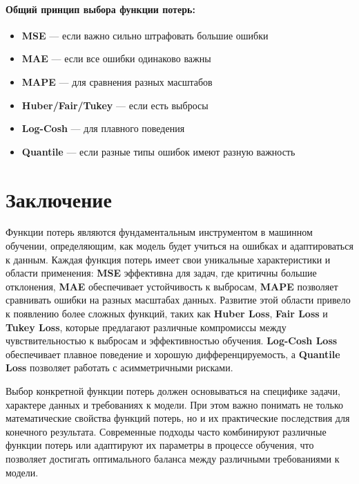 \paragraph{Общий принцип выбора функции потерь:}

\begin{itemize}
    \item \textbf{MSE} — если важно сильно штрафовать большие ошибки
    \item \textbf{MAE} — если все ошибки одинаково важны
    \item \textbf{MAPE} — для сравнения разных масштабов
    \item \textbf{Huber/Fair/Tukey} — если есть выбросы
    \item \textbf{Log-Cosh} — для плавного поведения
    \item \textbf{Quantile} — если разные типы ошибок имеют разную важность
\end{itemize}



\section{Заключение}

Функции потерь являются фундаментальным инструментом в машинном обучении, определяющим, как модель будет учиться на ошибках и адаптироваться к данным. Каждая функция потерь имеет свои уникальные характеристики и области применения: \textbf{MSE} эффективна для задач, где критичны большие отклонения, \textbf{MAE} обеспечивает устойчивость к выбросам, \textbf{MAPE} позволяет сравнивать ошибки на разных масштабах данных. Развитие этой области привело к появлению более сложных функций, таких как \textbf{Huber Loss}, \textbf{Fair Loss} и \textbf{Tukey Loss}, которые предлагают различные компромиссы между чувствительностью к выбросам и эффективностью обучения. \textbf{Log-Cosh Loss} обеспечивает плавное поведение и хорошую дифференцируемость, а \textbf{Quantile Loss} позволяет работать с асимметричными рисками. 

Выбор конкретной функции потерь должен основываться на специфике задачи, характере данных и требованиях к модели. При этом важно понимать не только математические свойства функций потерь, но и их практические последствия для конечного результата. Современные подходы часто комбинируют различные функции потерь или адаптируют их параметры в процессе обучения, что позволяет достигать оптимального баланса между различными требованиями к модели.




